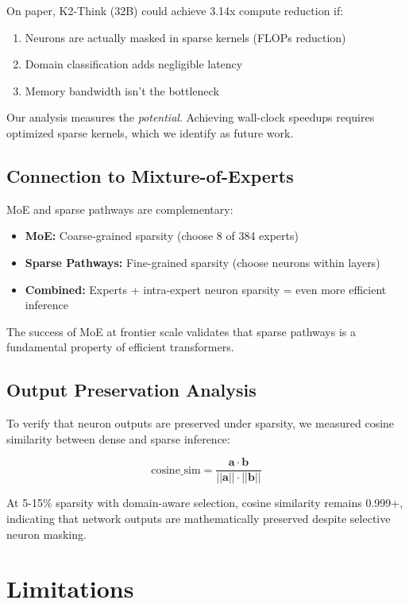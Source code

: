 \documentclass{article}
\begin{document}
On paper, K2-Think (32B) could achieve 3.14x compute reduction if:
\begin{enumerate}
    \item Neurons are actually masked in sparse kernels (FLOPs reduction)
    \item Domain classification adds negligible latency
    \item Memory bandwidth isn't the bottleneck
\end{enumerate}

Our analysis measures the \textit{potential}. Achieving wall-clock speedups requires optimized sparse kernels, which we identify as future work.

\subsection{Connection to Mixture-of-Experts}

MoE and sparse pathways are complementary:
\begin{itemize}
    \item \textbf{MoE:} Coarse-grained sparsity (choose 8 of 384 experts)
    \item \textbf{Sparse Pathways:} Fine-grained sparsity (choose neurons within layers)
    \item \textbf{Combined:} Experts + intra-expert neuron sparsity = even more efficient inference
\end{itemize}

The success of MoE at frontier scale validates that sparse pathways is a fundamental property of efficient transformers.

\subsection{Output Preservation Analysis}

To verify that neuron outputs are preserved under sparsity, we measured cosine similarity between dense and sparse inference:

\begin{equation}
\text{cosine\_sim} = \frac{\mathbf{a} \cdot \mathbf{b}}{||\mathbf{a}|| \cdot ||\mathbf{b}||}
\end{equation}

At 5-15\% sparsity with domain-aware selection, cosine similarity remains 0.999+, indicating that network outputs are mathematically preserved despite selective neuron masking.

\section{Limitations}
\end{document}
